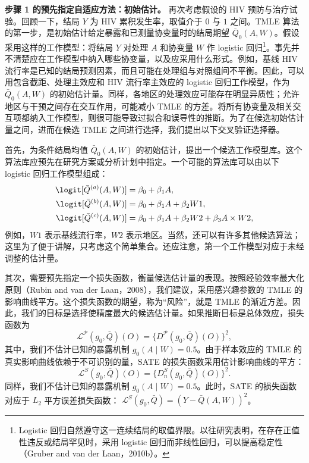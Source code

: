 \noindent\textbf{步骤 1 的预先指定自适应方法：初始估计。}
再次考虑假设的 HIV 预防与治疗试验。回顾一下，结局 $Y$ 为 HIV 累积发生率，取值介于 $0$ 与 $1$ 之间。TMLE 算法的第一步，是初始估计给定暴露和已测量协变量时的结局期望 $\bar Q_0(A,W)$。假设采用这样的工作模型：将结局 $Y$ 对处理 $A$ 和协变量 $W$ 作 logistic 回归\footnote{Logistic 回归自然遵守这一连续结局的取值界限。以往研究表明，在存在正值性违反或结局罕见时，采用 logistic 回归而非线性回归，可以提高稳定性（Gruber and van der Laan，2010b）。}。事先并不清楚应在工作模型中纳入哪些协变量，以及应采用什么形式。例如，基线 HIV 流行率是已知的结局预测因素，而且可能在处理组与对照组间不平衡。因此，可以用包含截距、处理主效应和 HIV 流行率主效应的 logistic 回归工作模型，作为 $\bar Q_0(A,W)$ 的初始估计量。同样，各地区的处理效应可能存在明显异质性；允许地区与干预之间存在交互作用，可能减小 TMLE 的方差。将所有协变量及相关交互项都纳入工作模型，则很可能导致过拟合和误导性的推断。为了在候选初始估计量之间，进而在候选 TMLE 之间进行选择，我们提出以下交叉验证选择器。

首先，为条件结局均值 $\bar Q_0(A,W)$ 的初始估计，提出一个候选工作模型库。这个算法库应预先在研究方案或分析计划中指定。一个可能的算法库可以由以下 logistic 回归工作模型组成：
\[
 \begin{aligned}
 \logit[\bar Q^{(a)}(A,W)]&=\beta_0+\beta_1A,\\
 \logit[\bar Q^{(b)}(A,W)]&=\beta_0+\beta_1A+\beta_2W1,\\
 \logit[\bar Q^{(c)}(A,W)]&=\beta_0+\beta_1A+\beta_2W2+\beta_3A\times W2,
 \end{aligned}
\]
例如，$W1$ 表示基线流行率，$W2$ 表示地区。当然，还可以有许多其他候选算法；这里为了便于讲解，只考虑这个简单集合。还应注意，第一个工作模型对应于未经调整的估计量。

其次，需要预先指定一个损失函数，衡量候选估计量的表现。按照经验效率最大化原则（Rubin and van der Laan，2008），我们建议，采用感兴趣参数的 TMLE 的影响曲线平方。这个损失函数的期望，称为“风险”，就是 TMLE 的渐近方差。因此，我们的目标是选择使精度最大的候选估计量。如果推断目标是总体效应，损失函数为
\begin{equation}
 \mathcal L^{\mathcal P}(g_0,\bar Q)(O)
 =\{D^{\mathcal P}(g_0,\bar Q)(O)\}^2,
 \tag{13.5}
\end{equation}
其中，我们不估计已知的暴露机制 $g_0(A\mid W)=0.5$。由于样本效应的 TMLE 的真实影响曲线依赖于不可识别的量，SATE 的损失函数采用估计影响曲线的平方：
\begin{equation}
 \mathcal L^S(g_0,\bar Q)(O)=\{D_n^S(g_0,\bar Q)(O)\}^2.
 \tag{13.6}
\end{equation}
同样，我们不估计已知的暴露机制 $g_0(A\mid W)=0.5$。此时，SATE 的损失函数对应于 $L_2$ 平方误差损失函数：
$\mathcal L^S(g_0,\bar Q)=(Y-\bar Q(A,W))^2$。

